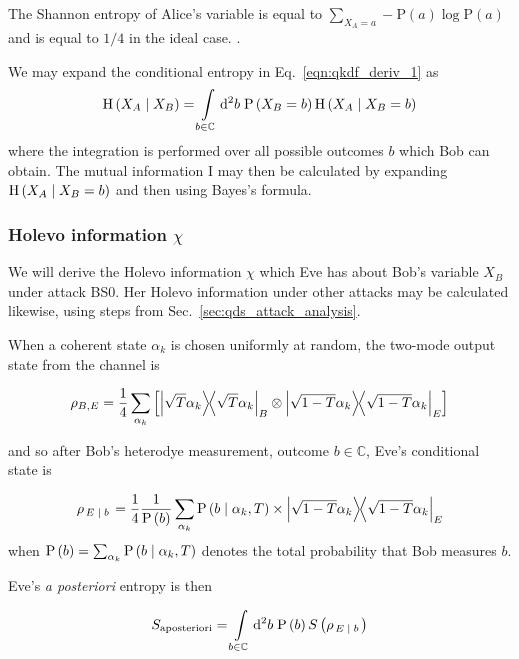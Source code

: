 \noindent The Shannon entropy of Alice's variable is equal to $\sum_{X_A=a} - \text{P}\left(a\right) \log \text{P}\left(a\right)$ and is equal to $1/4$ in the ideal case. .

We may expand the conditional entropy in Eq.~\ref{eqn:qkdf_deriv_1} as
\begin{equation}\label{eqn:qkdf_deriv_2}
\text{H}\left(X_A \; \middle| \; X_B\right) = \int\limits_{b \in \mathbb{C}} \mathop{}\!\mathrm{d^2} b \; \text{P}\left(X_B=b\right) \text{H}\left(X_A \; \middle| \; X_B=b\right)
\end{equation}
where the integration is performed over all possible outcomes $b$ which Bob can obtain. The mutual information I may then be calculated by expanding $\text{H}\left(X_A \; \middle| \; X_B=b\right)$ and then using Bayes's formula. 

\subsubsection{Holevo information $\chi$}
We will derive the Holevo information $\chi$ which Eve has about Bob's variable $X_B$ under attack BS$0$. Her Holevo information under other attacks may be calculated likewise, using steps from Sec.~\ref{sec:qds_attack_analysis}.

When a coherent state $\alpha_k$ is chosen uniformly at random, the two-mode output state from the channel is

\begin{equation}
\rho_{B, E} = \frac{1}{4} \sum_{\alpha_k} \left[ \dyad{\sqrt{T}\alpha_k}_B \otimes \dyad{\sqrt{1-T}\alpha_k}_E\right]
\end{equation}

\noindent and so after Bob's heterodye measurement, outcome $b \in \mathbb{C}$, Eve's conditional state is

\begin{equation}\label{eqn:qkdf_eve_conditional}
\rho_{\left. E \given b\right.} = \frac{1}{4} \frac{1}{\text{P}\left(b\right)} \sum_{\alpha_k} \text{P}\left(b \given \alpha_k, T\right) \times \dyad{\sqrt{1-T}\alpha_k}_E
\end{equation}
when $\text{P}\left(b\right) = \sum_{\alpha_k}\text{P}\left(b \; \middle| \; \alpha_k, T\right)$ denotes the total probability that Bob measures $b$.

Eve's \emph{a posteriori} entropy is then

\begin{equation}\label{eqn:qkdf_aposteriori_entropy}
S_{\text{aposteriori}} = \int\limits_{b \in \mathbb{C}} \mathop{}\!\mathrm{d^2} b \; \text{P}\left(b\right) S\left(\rho_{\left. E \; \middle| \; b \right.}\right)
\end{equation}

